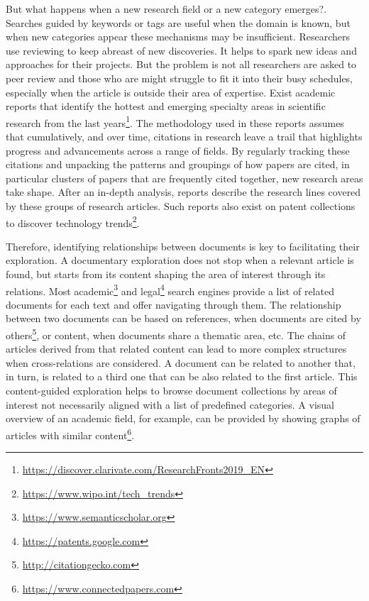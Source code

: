 But what happens when a new research field or a new category emerges?. Searches guided by keywords or tags are useful when the domain is known, but when new categories appear these mechanisms may be insufficient. Researchers use reviewing to keep abreast of new discoveries. It helps to spark new ideas and approaches for their projects. But the problem is not all researchers are asked to peer review and those who are might struggle to fit it into their busy schedules, especially when the article is outside their area of expertise. Exist academic reports that identify the hottest and emerging specialty areas in scientific research from the last years\footnote{\url{https://discover.clarivate.com/ResearchFronts2019_EN}}. The methodology used in these reports assumes that cumulatively, and over time, citations in research leave a trail that highlights progress and advancements across a range of fields. By regularly tracking these citations and unpacking the patterns and groupings of how papers are cited, in particular clusters of papers that are frequently cited together, new research areas take shape. After an in-depth analysis, reports describe the research lines covered by these groups of research articles. Such reports also exist on patent collections to discover technology trends\footnote{\url{https://www.wipo.int/tech_trends}}.

Therefore, identifying relationships between documents is key to facilitating their exploration. A documentary exploration does not stop when a relevant article is found, but starts from its content shaping the area of interest through its relations. Most academic\footnote{\url{https://www.semanticscholar.org}} and legal\footnote{\url{https://patents.google.com}} search engines provide a list of related documents for each text and offer navigating through them. The relationship between two documents can be based on references, when documents are cited by others\footnote{\url{http://citationgecko.com}}, or content, when documents share a thematic area, etc. The chains of articles derived from that related content can lead to more complex structures when cross-relations are considered. A document can be related to another that, in turn, is related to a third one that can be also related to the first article. This content-guided exploration helps to browse document collections by areas of interest not necessarily aligned with a list of predefined categories. A visual overview of an academic field, for example, can be provided by showing graphs of articles with similar content\footnote{\url{https://www.connectedpapers.com}}.


